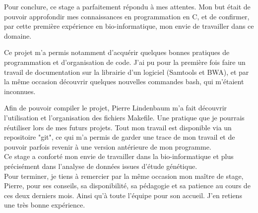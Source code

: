 \documentclass[a4paper,12pt]{article}
\begin{document}
Pour conclure, ce stage a parfaitement répondu à mes attentes.
Mon but était de pouvoir approfondir mes connaissances en programmation en C, et de confirmer, par cette première expérience en bio-informatique, mon envie de travailler dans ce domaine. 

Ce projet m'a permis notamment d'acquérir quelques bonnes pratiques de programmation et d'organisation de code. J'ai pu pour la première fois faire un travail de documentation sur la librairie d'un logiciel (Samtools et BWA), et par la même occasion découvrir quelques nouvelles commandes bash, qui m'étaient inconnues.  

Afin de pouvoir compiler le projet, Pierre Lindenbaum m'a fait découvrir l'utilisation et l'organisation des fichiers Makefile. Une pratique que je pourrais réutiliser lors de mes futurs projets. Tout mon travail est disponible via un repositoire "git", ce qui m'a permis de garder une trace de mon travail et de pouvoir parfois revenir à une version antérieure de mon programme. \\
 
Ce stage a conforté mon envie de travailler dans la bio-informatique et plus précisément dans l'analyse de données issues d'étude génétique. \\
 
Pour terminer, je tiens à remercier par la même occasion mon maître de stage, Pierre, pour ses conseils, sa disponibilité, sa pédagogie et sa patience au cours de ces deux derniers mois. Ainsi qu'à toute l'équipe pour son accueil. J'en retiens une très bonne expérience.

\clearpage


\end{document}
